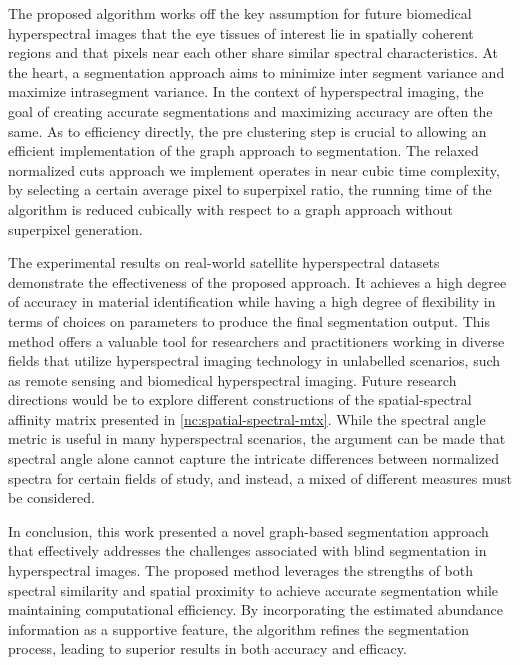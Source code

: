 The proposed algorithm works off the key assumption for future biomedical hyperspectral images that the eye tissues of interest lie in spatially coherent regions and that pixels near each other share similar spectral characteristics. At the heart, a segmentation approach aims to minimize inter segment variance and maximize intrasegment variance. In the context of hyperspectral imaging, the goal of creating accurate segmentations and maximizing accuracy are often the same. As to efficiency directly, the pre clustering step is crucial to allowing an efficient implementation of the graph approach to segmentation. The relaxed normalized cuts approach we implement operates in near cubic time complexity, by selecting a certain average pixel to superpixel ratio, the running time of the algorithm is reduced cubically with respect to a graph approach without superpixel generation.

The experimental results on real-world satellite hyperspectral datasets demonstrate the effectiveness of the proposed approach. It achieves a high degree of accuracy in material identification while having a high degree of flexibility in terms of choices on parameters to produce the final segmentation output. This method offers a valuable tool for researchers and practitioners working in diverse fields that utilize hyperspectral imaging technology in unlabelled scenarios, such as remote sensing and biomedical hyperspectral imaging. Future research directions would be to explore different constructions of the spatial-spectral affinity matrix presented in \eqref{nc:spatial-spectral-mtx}. While the spectral angle metric is useful in many hyperspectral scenarios, the argument can be made that spectral angle alone cannot capture the intricate differences between normalized spectra for certain fields of study, and instead, a mixed of different measures must be considered.

In conclusion, this work presented a novel graph-based segmentation approach that effectively addresses the challenges associated with blind segmentation in hyperspectral images. The proposed method leverages the strengths of both spectral similarity and spatial proximity to achieve accurate segmentation while maintaining computational efficiency. By incorporating the estimated abundance information as a supportive feature, the algorithm refines the segmentation process, leading to superior results in both accuracy and efficacy.
